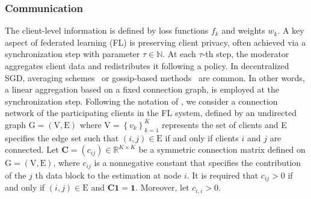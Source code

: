 \documentclass[a4paper,11pt]{article}
\numberwithin{equation}{section}
\theoremstyle{plain}
\theoremstyle{remark}
\def\bo{\mathbf{1}}
\def\bC{\mathbf{C}}
\begin{document}
\subsubsection{Communication}\label{se:dfl_communication}
The client-level information is defined by loss functions \( f_k \) and weights \( w_k \). A key aspect of federated learning (FL) is preserving client privacy, often achieved via a synchronization step with parameter \( \tau \in \mathbb{N} \). At each \( \tau \)-th step, the moderator aggregates client data and redistributes it following a policy. In decentralized SGD, averaging schemes~\cite{duchi15,lian2017can,ivkin2019} or gossip-based methods~\cite{koloskova2020unified,li2019communication,qin2021,wang2021} are common. In other words, a linear aggregation based on a fixed connection graph, is employed at the synchronization step. Following the notation of \cite{songxichen2024}, we consider a connection network of the participating clients in the FL system, defined by an undirected graph $\mathrm{G}=(\mathrm{V}, \mathrm{E})$ where $\mathrm{V}=\left\{v_k\right\}_{k=1}^K$ represents the set of clients and E specifies the edge set such that $(i, j) \in \mathrm{E}$ if and only if clients $i$ and $j$ are connected.  Let $\mathbf{C}=\left(c_{i j}\right) \in \mathbb{R}^{K \times K}$ be a symmetric connection matrix defined on $\mathrm{G}=(\mathrm{V}, \mathrm{E})$, where $c_{i j}$ is a nonnegative constant that specifies the contribution of the $j$ th data block to the estimation at node $i$. It is required that $c_{i j}>0$ if and only if $(i, j) \in \mathrm{E}$ and $\bC\bo=\bo$. Moreover, let $c_{i,i}>0$.%
 
\end{document}
